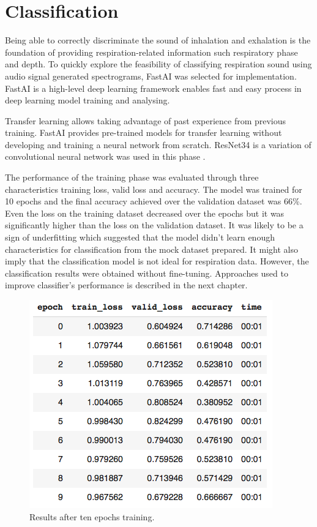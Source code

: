 \section{Classification}
Being able to correctly discriminate the sound of inhalation and exhalation is the foundation of providing respiration-related information such respiratory phase and depth. To quickly explore the feasibility of classifying respiration sound using audio signal generated spectrograms, FastAI was selected for implementation. FastAI is a high-level deep learning framework enables fast and easy process in deep learning model training and analysing. 

Transfer learning allows taking advantage of past experience from previous training. FastAI provides pre-trained models for transfer learning without developing and training a neural network from scratch. ResNet34 is a variation of convolutional neural network was used in this phase \cite{He2016DeepRecognition}.

The performance of the training phase was evaluated through three characteristics training loss, valid loss and accuracy. The model was trained for 10 epochs and the final accuracy achieved over the validation dataset was 66\%. Even the loss on the training dataset decreased over the epochs but it was significantly higher than the loss on the validation dataset. It was likely to be a sign of underfitting which suggested that the model didn't learn enough characteristics for classification from the mock dataset prepared. It might also imply that the classification model is not ideal for respiration data. However, the classification results were obtained without fine-tuning. Approaches used to improve classifier's performance is described in the next chapter. 
\begin{figure}[h]
    \centering
    \includegraphics[scale=0.6]{figures/classification_results.png}
    \caption{Results after ten epochs training.}
    \label{fig:classification_results}
\end{figure}